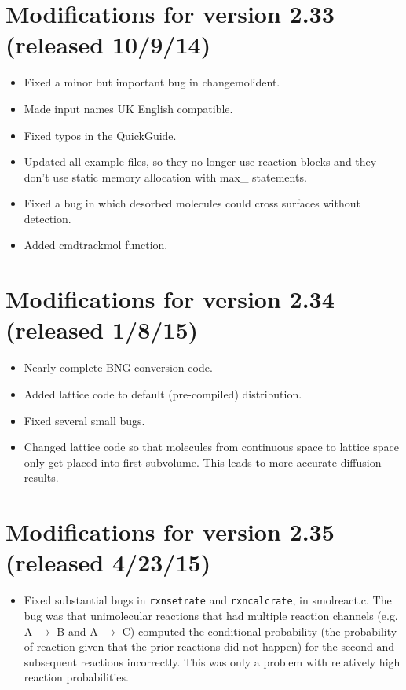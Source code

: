 \documentclass {scrbook}
\newcommand {\ttt} {\texttt}
\begin{document}
\section{Modifications for version 2.33 (released 10/9/14)}
\begin{itemize}
\item Fixed a minor but important bug in changemolident.
\item Made input names UK English compatible.
\item Fixed typos in the QuickGuide.
\item Updated all example files, so they no longer use reaction blocks and they don't use static memory allocation with max\_ statements.
\item Fixed a bug in which desorbed molecules could cross surfaces without detection.
\item Added cmdtrackmol function.
\end{itemize}

\section{Modifications for version 2.34 (released 1/8/15)}
\begin{itemize}
\item Nearly complete BNG conversion code.
\item Added lattice code to default (pre-compiled) distribution.
\item Fixed several small bugs.
\item Changed lattice code so that molecules from continuous space to lattice space only get placed into first subvolume. This leads to more accurate diffusion results.
\end{itemize}

\section{Modifications for version 2.35 (released 4/23/15)}
\begin{itemize}
\item Fixed substantial bugs in \ttt{rxnsetrate} and \ttt{rxncalcrate}, in smolreact.c. The bug was that unimolecular reactions that had multiple reaction channels (e.g. A $\rightarrow$ B and A $\rightarrow$ C) computed the conditional probability (the probability of reaction given that the prior reactions did not happen) for the second and subsequent reactions incorrectly. This was only a problem with relatively high reaction probabilities.
\end{itemize}
\end{document}
